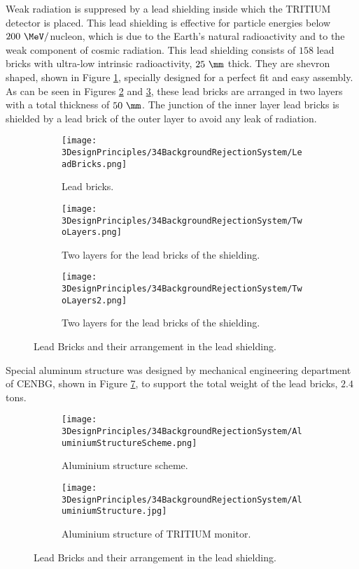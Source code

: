 Weak radiation is suppresed by a lead shielding inside which the TRITIUM detector is placed. This lead shielding is effective for particle energies below $200~\MeV/$nucleon, which is due to the Earth's natural radioactivity and to the weak component of cosmic radiation. This lead shielding consists of $158$ lead bricks with ultra-low intrinsic radioactivity, $25~\mm$ thick. They are shevron shaped, shown in Figure \ref{subfig:LeadBricks}, specially designed for a perfect fit and easy assembly. As can be seen in Figures \ref{subfig:TwoLayers} and \ref{subfig:TwoLayers2}, these lead bricks are arranged in two layers with a total thickness of $50~\mm$. The junction of the inner layer lead bricks is shielded by a lead brick of the outer layer to avoid any leak of radiation.

\begin{figure}
\centering
    \begin{subfigure}[b]{0.3\textwidth}
    \centering
    \texttt{[image: 3DesignPrinciples/34BackgroundRejectionSystem/LeadBricks.png]}  
    \caption{Lead bricks.\label{subfig:LeadBricks}}
    \end{subfigure}
    \hfill
    \begin{subfigure}[b]{0.3\textwidth}
    \centering
    \texttt{[image: 3DesignPrinciples/34BackgroundRejectionSystem/TwoLayers.png]}  
    \caption{Two layers for the lead bricks of the shielding.\label{subfig:TwoLayers}}
    \end{subfigure}
    \hfill
    \begin{subfigure}[b]{0.3\textwidth}
    \centering
    \texttt{[image: 3DesignPrinciples/34BackgroundRejectionSystem/TwoLayers2.png]}  
    \caption{Two layers for the lead bricks of the shielding.\label{subfig:TwoLayers2}}
    \end{subfigure}
 \caption{Lead Bricks and their arrangement in the lead shielding.}
 \label{fig:LeadBricksAndArrangement}
\end{figure}

Special aluminum structure was designed by mechanical engineering department of CENBG, shown in Figure \ref{fig:AluminiumStructure}, to support the total weight of the lead bricks, $2.4$ tons.

\begin{figure}
\centering
    \begin{subfigure}[b]{0.45\textwidth}
    \centering
    \texttt{[image: 3DesignPrinciples/34BackgroundRejectionSystem/AluminiumStructureScheme.png]}  
    \caption{Aluminium structure scheme.\label{subfig:AluminiumStructureScheme}}
    \end{subfigure}
    \hfill
    \begin{subfigure}[b]{0.4\textwidth}
    \centering
    \texttt{[image: 3DesignPrinciples/34BackgroundRejectionSystem/AluminiumStructure.jpg]}  
    \caption{Aluminium structure of TRITIUM monitor.\label{subfig:AluminiumStructure}}
    \end{subfigure}
    \caption{Lead Bricks and their arrangement in the lead shielding.}
 \label{fig:AluminiumStructure}
\end{figure}

